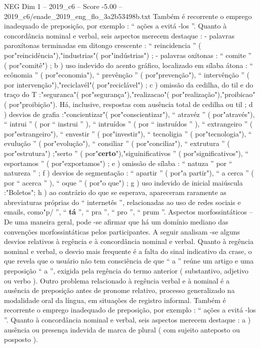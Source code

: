 \begin{textsample}{NEG Dim 1 – 2019\_c6 – Score -5.00 – 2019\_c6/enade\_2019\_eng\_flo\_3a2b53498b.txt}
Também é recorrente o emprego inadequado de preposição, por exemplo : “ ações a evitá -los ”.
Quanto à concordância nominal e verbal, seis aspectos merecem destaque : - palavras paroxítonas terminadas em ditongo crescente : “ reincidencia ” ( por"reincidência"),"industrias"( por"indústrias") ; - palavras oxítonas : “ comite ” ( por"comitê") ; b ) uso indevido do acento gráfico, localizado em sílaba átona : “ ecônomia ” ( por"economia"), “ prevênção ” ( por"prevenção"), “ intervênção ” ( por intervenção"),"reciclavél"( por"reciclável") ; c ) omissão da cedilha, do til e do traço do T :"seguranca"( por"segurança"),"realizacao"( por"realização"),"proibicao"( por"proibição").
Há, inclusive, respostas com ausência total de cedilha ou til ; d ) desvios de grafia :"concientizar"( por"conscientizar"), “ atravéz ” ( por"através"), “ intrui ” ( por “ instrui ” ), “ intruídos ” ( por “ instruídos ” ), “ extrangeiro ” ( por"estrangeiro"), “ envestir ” ( por"investir"), “ tecnoligia ” ( por"tecnologia"), “ evulução ” ( por"evolução"), “ consiliar ” ( por"conciliar"), “ extrutura ” ( por"estrutura") ;"serto ” ( por"\textbf{certo}"),"siguinificativos ” ( por"significativos"), “ esportamos ” ( por"exportamos") ; e ) omissão de sílaba : “ natuza ” por “ natureza ” ; f ) desvios de segmentação : “ apartir ” ( por"a partir"), “ a cerca ” ( por “ acerca ” ), “ oque ” ( por"o que") ; g ) uso indevido de inicial maiúscula :"Boletos"; h ) ao contrário do que se esperava, apareceram raramente as abreviaturas próprias do “ internetês ”, relacionadas ao uso de redes sociais e emails, como"p/ ”, “ \textbf{tá} ”, “ pra ”, “ pro ”, “ prum ”.
Aspectos morfossintáticos – De uma maneira geral, pode -se afirmar que há um domínio mediano das convenções morfossintáticas pelos participantes.
A seguir analisam -se alguns desvios relativos à regência e à concordância nominal e verbal.
Quanto à regência nominal e verbal, o desvio mais frequente é a falta do sinal indicativo da crase, o que revela que o usuário não tem consciência de que “ a ” reúne um artigo e uma preposição “ a ”, exigida pela regência do termo anterior ( substantivo, adjetivo ou verbo ).
Outro problema relacionado à regência verbal e à nominal é a ausência de preposição antes de pronome relativo, processo generalizado na modalidade oral da língua, em situações de registro informal.
Também é recorrente o emprego inadequado de preposição, por exemplo : “ ações a evitá -los ”.
Quanto à concordância nominal e verbal, seis aspectos merecem destaque : a ) ausência ou presença indevida de marca de plural ( com sujeito anteposto ou posposto ).

\end{textsample}
